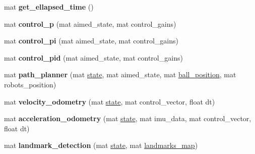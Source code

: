 \begin{DoxyCompactItemize}
\item 
\mbox{\label{class_robot_navigation_a63b9ea0c29057b9be47cccff6010eb8b}} 
mat {\bfseries get\+\_\+ellapsed\+\_\+time} ()
\item 
\mbox{\label{class_robot_navigation_a81ea2b1ff7b0701a716ab6b8bac92be4}} 
mat {\bfseries control\+\_\+p} (mat aimed\+\_\+state, mat control\+\_\+gains)
\item 
\mbox{\label{class_robot_navigation_aa00a37c4a425f8ba2b83a208845747f5}} 
mat {\bfseries control\+\_\+pi} (mat aimed\+\_\+state, mat control\+\_\+gains)
\item 
\mbox{\label{class_robot_navigation_a5800adf6538584180ca33a2143934dfd}} 
mat {\bfseries control\+\_\+pid} (mat aimed\+\_\+state, mat control\+\_\+gains)
\item 
\mbox{\label{class_robot_navigation_a676195ab5a04e08452dc6fb23f84ce10}} 
mat {\bfseries path\+\_\+planner} (mat \hyperlink{class_robot_navigation_a93eb7dd2877e1f72f5741fb396adea81}{state}, mat aimed\+\_\+state, mat \hyperlink{class_robot_navigation_a1e4f1a5b3c01ba9be911c006b478f371}{ball\+\_\+position}, mat robots\+\_\+position)
\item 
\mbox{\label{class_robot_navigation_a50667808e539f4b632af5f60628cc228}} 
mat {\bfseries velocity\+\_\+odometry} (mat \hyperlink{class_robot_navigation_a93eb7dd2877e1f72f5741fb396adea81}{state}, mat control\+\_\+vector, float dt)
\item 
\mbox{\label{class_robot_navigation_a0ca549632dc878d276ab2da06e5ed41b}} 
mat {\bfseries acceleration\+\_\+odometry} (mat \hyperlink{class_robot_navigation_a93eb7dd2877e1f72f5741fb396adea81}{state}, mat imu\+\_\+data, mat control\+\_\+vector, float dt)
\item 
\mbox{\label{class_robot_navigation_a94927041a7f2f2bc9c45803a84d5a9d6}} 
mat {\bfseries landmark\+\_\+detection} (mat \hyperlink{class_robot_navigation_a93eb7dd2877e1f72f5741fb396adea81}{state}, mat \hyperlink{class_robot_navigation_a1efd2001bd7cd70cc80d1c05b1c97988}{landmarks\+\_\+map})
\end{DoxyCompactItemize}
